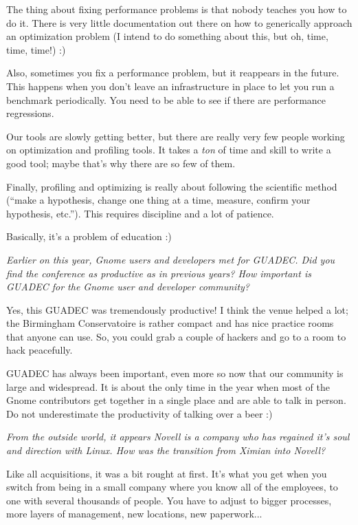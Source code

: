 \documentclass{memoir}
\begin{document}
\bigskip

The thing about fixing performance problems is that nobody teaches you
how to do it. There is very little documentation out there on how to
generically approach an optimization problem (I intend to do something
about this, but oh, time, time, time!) :)

Also, sometimes you fix a performance problem, but it reappears in the
future. This happens when you don't leave an infrastructure in place
to let you run a benchmark periodically. You need to be able to see if
there are performance regressions.

Our tools are slowly getting better, but there are really very few
people working on optimization and profiling tools. It takes a
\emph{ton} of time and skill to write a good tool; maybe that's why
there are so few of them.

Finally, profiling and optimizing is really about following the
scientific method (``make a hypothesis, change one thing at a time,
measure, confirm your hypothesis, etc.''). This requires discipline and
a lot of patience.

Basically, it's a problem of education :)

\bigskip

\emph{Earlier on this year, Gnome users and developers met for
GUADEC. Did you find the conference as productive as in previous
years? How important is GUADEC for the Gnome user and developer
community?}

\bigskip

Yes, this GUADEC was tremendously productive! I think the venue helped
a lot; the Birmingham Conservatoire is rather compact and has nice
practice rooms that anyone can use. So, you could grab a couple of
hackers and go to a room to hack peacefully.

GUADEC has always been important, even more so now that our community
is large and widespread. It is about the only time in the year when
most of the Gnome contributors get together in a single place and are
able to talk in person. Do not underestimate the productivity of
talking over a beer :)

\bigskip

\emph{From the outside world, it appears Novell is a company who has
regained it's soul and direction with Linux. How was the transition
from Ximian into Novell?}

\bigskip

Like all acquisitions, it was a bit rought at first. It's what you get
when you switch from being in a small company where you know all of
the employees, to one with several thousands of people. You have to
adjust to bigger processes, more layers of management, new locations,
new paperwork...
\end{document}
